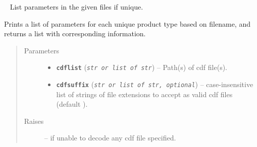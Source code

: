 \documentclass[letterpaper,10pt,english]{sphinxhowto}
\begin{document}

\begin{fulllineitems}
\label{swtools_doc:swtools.getCDFparamlist}~\label{swtools_doc:getcdfparamlist}
List parameters in the given files if unique.

Prints a list of parameters for each unique product type based on
filename, and returns a list with corresponding information.
\begin{quote}\begin{description}
\item[{Parameters}] \leavevmode\begin{itemize}
\item {} 
\textbf{\texttt{cdflist}} (\emph{\texttt{str or list of str}}) -- Path(s) of cdf file(s).

\item {} 
\textbf{\texttt{cdfsuffix}} (\emph{\texttt{str or list of str, optional}}) -- case-insensitive list of strings of file extensions to accept
as valid cdf files (default ).

\end{itemize}

\item[{Raises}] \leavevmode
{} --
if unable to decode any cdf file specified.

\end{description}\end{quote}

\end{fulllineitems}

\end{document}
